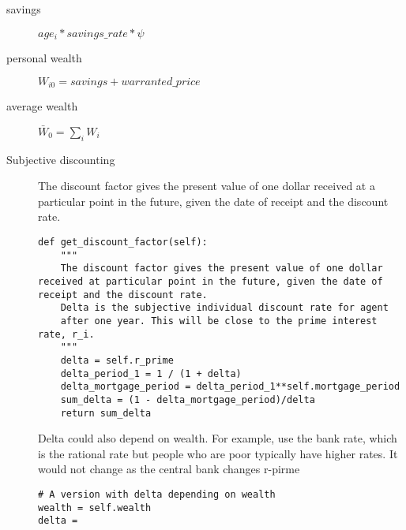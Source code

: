 \begin{description}
\item [savings] $age_i*savings\_rate*\psi$
\item[personal wealth] $W_{i0}= savings + warranted\_price $
\item[average wealth] $\bar W_{0}= \sum_i W_i$
\item[Subjective discounting] The discount factor gives the present value of one dollar received at a particular point in the future, given the date of receipt and the discount rate.
\begin{lstlisting}
def get_discount_factor(self):
    """
    The discount factor gives the present value of one dollar received at particular point in the future, given the date of receipt and the discount rate.
    Delta is the subjective individual discount rate for agent
    after one year. This will be close to the prime interest rate, r_i.
    """    
    delta = self.r_prime
    delta_period_1 = 1 / (1 + delta) 
    delta_mortgage_period = delta_period_1**self.mortgage_period
    sum_delta = (1 - delta_mortgage_period)/delta
    return sum_delta
\end{lstlisting}
Delta could also depend on wealth. For example,  use the bank rate, which is the rational rate but people who are poor typically have higher rates.  It would not change as the central bank changes r-pirme


\begin{lstlisting}
# A version with delta depending on wealth
wealth = self.wealth
delta =
\end{lstlisting}


\end{description}

